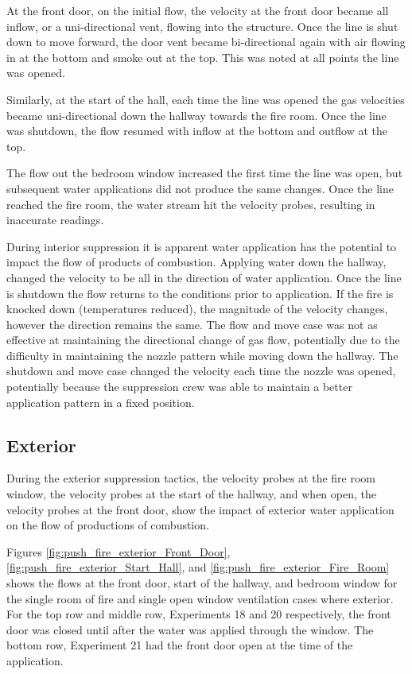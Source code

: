 \documentclass[12pt,oneside]{book}
\begin{document}
At the front door, on the initial flow, the velocity at the front door became all inflow, or a uni-directional vent, flowing into the structure. Once the line is shut down to move forward, the door vent became bi-directional again with air flowing in at the bottom and smoke out at the top. This was noted at all points the line was opened. 

Similarly, at the start of the hall, each time the line was opened the gas velocities became uni-directional down the hallway towards the fire room. Once the line was shutdown, the flow resumed with inflow at the bottom and outflow at the top.

The flow out the bedroom window increased the first time the line was open, but subsequent water applications did not produce the same changes. Once the line reached the fire room, the water stream hit the velocity probes, resulting in inaccurate readings. 

During interior suppression it is apparent water application has the potential to impact the flow of products of combustion. Applying water down the hallway, changed the velocity to be all in the direction of water application. Once the line is shutdown the flow returns to the conditions prior to application. If the fire is knocked down (temperatures reduced), the magnitude of the velocity changes, however the direction remains the same. The flow and move case was not as effective at maintaining the directional change of gas flow, potentially due to the difficulty in maintaining the nozzle pattern while moving down the hallway. The shutdown and move case changed the velocity each time the nozzle was opened, potentially because the suppression crew was able to maintain a better application pattern in a fixed position.

\subsection{Exterior}
During the exterior suppression tactics, the velocity probes at the fire room window, the velocity probes at the start of the hallway, and when open, the velocity probes at the front door, show the impact of exterior water application on the flow of productions of combustion. 

Figures \ref{fig:push_fire_exterior_Front_Door}, \ref{fig:push_fire_exterior_Start_Hall}, and \ref{fig:push_fire_exterior_Fire_Room} shows the flows at the front door, start of the hallway, and bedroom window for the single room of fire and single open window ventilation cases where exterior. For the top row and middle row, Experiments 18 and 20 respectively, the front door was closed until after the water was applied through the window. The bottom row, Experiment 21 had the front door open at the time of the application. 
\end{document}

